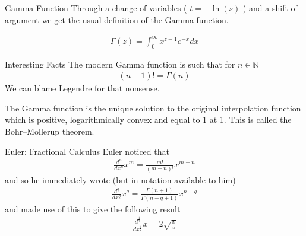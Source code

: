 \documentclass[pdf]{beamer}
\newcommand{\Ntrl}{\mathbb{N}}
\begin{document}
\begin{frame}{Gamma Function}
Through a change of variables ( $ t = -\ln(s) $ ) and a shift of argument we get the usual definition of the Gamma function.
    \begin{definition}
        \begin{align*}
            \Gamma(z) = \int_0^\infty x^{z-1} e^{-x} dx
        \end{align*}
    \end{definition}    
\end{frame}
\begin{frame}{Interesting Facts}
    The modern Gamma function is such that for $ n \in \Ntrl $
    \begin{align*}
        (n-1)! = \Gamma(n)
    \end{align*}
    We can blame Legendre for that nonsense.


    The Gamma function is the unique solution to the original interpolation function which is positive, logarithmically convex and equal to 1 at 1. This is called the  Bohr–Mollerup theorem.
\end{frame}
\begin{frame}{Euler: Fractional Calculus}
    Euler noticed that
    \begin{align*}
        \frac{d^n}{dx^n} x^m = \frac{m!}{(m-n)!}x^{m-n}
    \end{align*}
    and so he immediately wrote (but in notation available to him)
    \begin{align*}
        \frac{d^q}{dx^q} x^q = \frac{\Gamma(n+1)}{\Gamma(n-q+1)} x^{n-q}
    \end{align*}
    and made use of this to give the following result
    \begin{align*}
        \frac{d^\frac{1}{2}}{dx^\frac{1}{2}} x = 2 \sqrt{\frac{x}{\pi}}
    \end{align*}
\end{frame}
\end{document}

